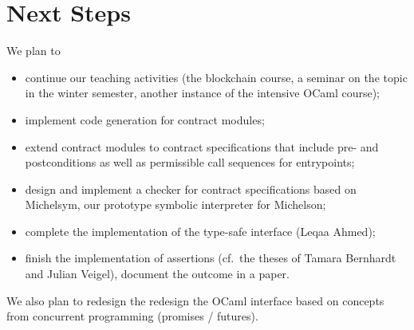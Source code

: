 \documentclass[a4paper,11pt]{article}
\begin{document}
\section{Next Steps}

We plan to 
\begin{itemize}
\item continue our teaching activities (the blockchain course, a seminar on the topic in the winter semester, another instance of the intensive OCaml course);
\item implement code generation for contract modules;
\item extend contract modules to contract specifications that include pre- and postconditions as well as permissible call sequences for entrypoints; 
\item design and implement a checker for contract specifications based on Michelsym, our prototype symbolic interpreter for Michelson;
\item complete the implementation of the type-safe interface (Leqaa Ahmed);
\item finish the implementation of assertions (cf.\ the theses of Tamara Bernhardt and Julian Veigel), document the outcome in a paper.
\end{itemize}
We also plan to redesign the redesign the OCaml interface based on concepts from concurrent programming (promises / futures).





\end{document}
